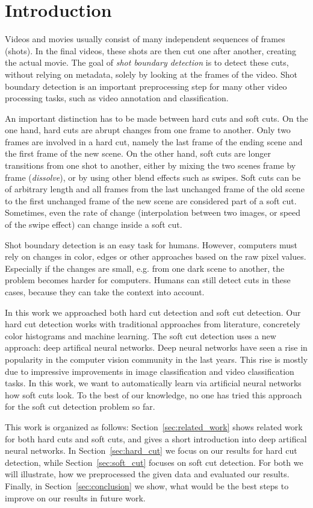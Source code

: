 \section{Introduction}
\label{sec:introduction}

Videos and movies usually consist of many independent sequences of frames (shots).
In the final videos, these shots are then cut one after another, creating the actual movie.
The goal of \emph{shot boundary detection} is to detect these cuts, without relying on metadata, solely by looking at the frames of the video.
Shot boundary detection is an important preprocessing step for many other video processing tasks, such as video annotation and classification.

An important distinction has to be made between hard cuts and soft cuts.
On the one hand, hard cuts are abrupt changes from one frame to another.
Only two frames are involved in a hard cut, namely the last frame of the ending scene and the first frame of the new scene.
On the other hand, soft cuts are longer transitions from one shot to another, either by mixing the two scenes frame by frame (\emph{dissolve}), or by using other blend effects such as swipes.
Soft cuts can be of arbitrary length and all frames from the last unchanged frame of the old scene to the first unchanged frame of the new scene are considered part of a soft cut.
Sometimes, even the rate of change (interpolation between two images, or speed of the swipe effect) can change inside a soft cut.

Shot boundary detection is an easy task for humans.
However, computers must rely on changes in color, edges or other approaches based on the raw pixel values.
Especially if the changes are small, e.g. from one dark scene to another, the problem becomes harder for computers.
Humans can still detect cuts in these cases, because they can take the context into account.

In this work we approached both hard cut detection and soft cut detection.
Our hard cut detection works with traditional approaches from literature, concretely color histograms and machine learning.
The soft cut detection uses a new approach: deep artifical neural networks.
Deep neural networks have seen a rise in popularity in the computer vision community in the last years.
This rise is mostly due to impressive improvements in image classification and video classification tasks.
In this work, we want to automatically learn via artificial neural networks how soft cuts look.
To the best of our knowledge, no one has tried this approach for the soft cut detection problem so far.

This work is organized as follows:
Section~\ref{sec:related_work} shows related work for both hard cuts and soft cuts, and gives a short introduction into deep artifical neural networks.
In Section~\ref{sec:hard_cut} we focus on our results for hard cut detection, while Section~\ref{sec:soft_cut} focuses on soft cut detection.
For both we will illustrate, how we preprocessed the given data and evaluated our results.
Finally, in Section~\ref{sec:conclusion} we show, what would be the best steps to improve on our results in future work.
